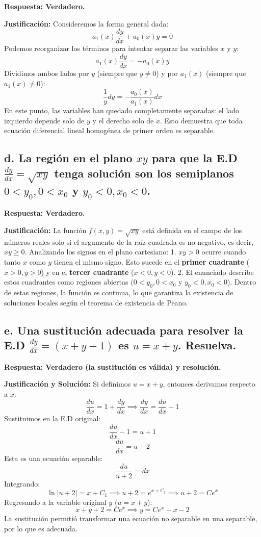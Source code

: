 \documentclass[a4paper]{article}
\begin{document}
\textbf{Respuesta: Verdadero.}

\textbf{Justificación:}
Consideremos la forma general dada:
$$a_1(x) \frac{dy}{dx} + a_0(x)y = 0$$
Podemos reorganizar los términos para intentar separar las variables $x$ y $y$:
$$a_1(x) \frac{dy}{dx} = -a_0(x)y$$
Dividimos ambos lados por $y$ (siempre que $y \neq 0$) y por $a_1(x)$ (siempre que $a_1(x) \neq 0$):
$$\frac{1}{y} dy = -\frac{a_0(x)}{a_1(x)} dx$$
En este punto, las variables han quedado completamente separadas: el lado izquierdo depende solo de $y$ y el derecho solo de $x$. Esto demuestra que toda ecuación diferencial lineal homogénea de primer orden es separable.

\subsection*{d. La región en el plano $xy$ para que la E.D $\frac{dy}{dx} = \sqrt{xy}$ tenga solución son los semiplanos $0 < y_0, 0 < x_0$ y $y_0 < 0, x_0 < 0$.}

\textbf{Respuesta: Verdadero.}

\textbf{Justificación:}
La función $f(x, y) = \sqrt{xy}$ está definida en el campo de los números reales solo si el argumento de la raíz cuadrada es no negativo, es decir, $xy \geq 0$. Analizando los signos en el plano cartesiano:
1. $xy > 0$ ocurre cuando tanto $x$ como $y$ tienen el mismo signo. Esto sucede en el \textbf{primer cuadrante} ($x > 0, y > 0$) y en el \textbf{tercer cuadrante} ($x < 0, y < 0$).
2. El enunciado describe estos cuadrantes como regiones abiertas ($0 < y_0, 0 < x_0$ y $y_0 < 0, x_0 < 0$).
Dentro de estas regiones, la función es continua, lo que garantiza la existencia de soluciones locales según el teorema de existencia de Peano.

\subsection*{e. Una sustitución adecuada para resolver la E.D $\frac{dy}{dx} = (x + y + 1)$ es $u = x + y$. Resuelva.}

\textbf{Respuesta: Verdadero (la sustitución es válida) y resolución.}

\textbf{Justificación y Solución:}
Si definimos $u = x + y$, entonces derivamos respecto a $x$:
$$\frac{du}{dx} = 1 + \frac{dy}{dx} \implies \frac{dy}{dx} = \frac{du}{dx} - 1$$
Sustituimos en la E.D original:
$$\frac{du}{dx} - 1 = u + 1$$
$$\frac{du}{dx} = u + 2$$
Esta es una ecuación separable:
$$\frac{du}{u+2} = dx$$
Integrando:
$$\ln|u+2| = x + C_1 \implies u+2 = e^{x+C_1} \implies u+2 = Ce^x$$
Regresando a la variable original $y$ ($u = x+y$):
$$x + y + 2 = Ce^x \implies y = Ce^x - x - 2$$
La sustitución permitió transformar una ecuación no separable en una separable, por lo que es adecuada.
\end{document}
